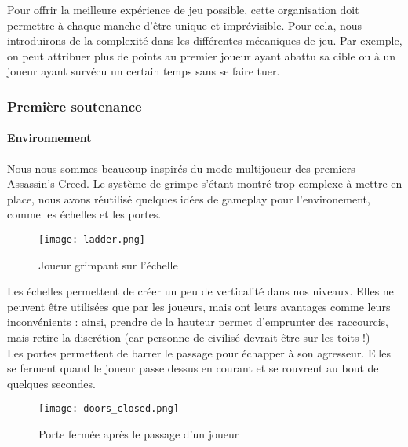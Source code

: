			Pour offrir la meilleure expérience de jeu possible, cette organisation
			doit permettre à chaque manche d'être unique et imprévisible.
			Pour cela, nous introduirons de la complexité dans les différentes
			mécaniques de jeu. Par exemple, on peut attribuer plus de points
			au premier joueur ayant abattu sa cible ou à un joueur ayant
			survécu un certain temps sans se faire tuer.


			
	\subsubsection{Première soutenance}

        \paragraph{Environnement}

            Nous nous sommes beaucoup inspirés du mode multijoueur des premiers Assassin's Creed.
            Le système de grimpe s'étant montré trop complexe à mettre en place, 
            nous avons réutilisé quelques idées de gameplay pour l'environement, comme les échelles et les portes.\\

            \begin{figure}[hbt!]
                \centering
                \texttt{[image: ladder.png]}
                \caption{Joueur grimpant sur l'échelle}
            \end{figure}

            Les échelles permettent de créer un peu de verticalité dans nos niveaux.
            Elles ne peuvent être utilisées que par les joueurs, mais ont leurs avantages comme leurs inconvénients : ainsi,
            prendre de la hauteur permet d'emprunter des raccourcis, mais retire la discrétion (car personne de civilisé devrait être sur les toits !) \\
            
            Les portes permettent de barrer le passage pour échapper à son agresseur.
            Elles se ferment quand le joueur passe dessus en courant
            et se rouvrent au bout de quelques secondes.

            \begin{figure}[ht]
                \centering
                \texttt{[image: doors\_closed.png]}
                \caption{Porte fermée après le passage d'un joueur}
            \end{figure}


